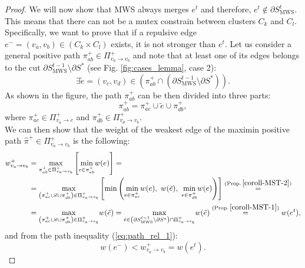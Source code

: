 \begin{proof}
We will now show that MWS always merges $e^{t}$ and therefore, $e^{t} \notin \partial S_{\mathrm{MWS}}^{t}$. This means that there can not be a mutex constrain between clusters $C_{k}$ and $C_{l}$. %
Specifically, we want to prove that if a repulsive edge $e^{-}=(v_{a},v_{b})\in(C_{k}\times C_{l})$
exists, it is not stronger than $e^{t}$. Let us consider a general positive path $\pi_{ab}^{+}\in\Pi_{v_{a}\rightarrow v_{b}}^{+}$
and note that at least one of its edges belongs to the cut $\partial S_{\mathrm{MWS}}^{t-1}\setminus\partial S^{*}$ (see Fig. \ref{fig:cases_lemma}, case 2): 
\[
\exists\tilde{e}=(v_{c},v_{d})\in\left(\pi_{ab}^{+}\cap\left(\partial S_{\mathrm{MWS}}^{t-1}\setminus\partial S^{*}\right)\right).
\]
As shown in the figure, the path $\pi_{ab}^{+}$ can be then divided into three parts:
\[
\pi_{ab}^{+}=\pi_{ac}^{+}\cup\tilde{e}\cup\pi_{db}^{+},
\]
where $\pi_{ac}^{+}\in\Pi_{v_{a}\rightarrow c}^{+}$ and $\pi_{db}^{+}\in\Pi_{v_{d}\rightarrow v_{b}}^{+}$.\\
We can then show that the weight of the weakest edge of the maximin positive path $\hat{\pi}^{+}\in\Pi_{v_{a}\rightarrow v_{b}}^{+}$ is the following:
\begin{align*}
w_{v_{a}\rightarrow v_{b}}^{+} & =\underset{\pi_{ab}^{+}\in\Pi_{v_{a}\rightarrow v_{b}}^{+}}{\max}\left[\underset{e\in\pi_{ab}^{+}}{\min}w(e)\right]=\\
 & =\underset{\left(\pi_{ac}^{+}\cup\tilde{e}\cup\pi_{db}^{+}\right)\in\Pi_{v_{a}\rightarrow v_{b}}^{+}}{\max}\left[\min\left( \underset{e\in\pi_{ac}^{+}}{\min}w(e),\,\,w(\tilde{e}),\,\,\underset{e\in\pi_{db}^{+}}{\min}w(e)\right) \right]\stackrel{(\mathrm{Prop.\,}\ref{coroll-MST-2})}{=}\\
 & =\underset{\left(\pi_{ac}^{+}\cup\tilde{e}\cup\pi_{db}^{+}\right)\in\Pi_{v_{a}\rightarrow v_{b}}^{+}}{\max}w(\tilde{e})=\underset{\tilde{e}\in\left(\partial S_{\mathrm{MWS}}^{t-1}\setminus\partial S^{*}\right) \cap \Pi_{v_{a}\rightarrow v_{b}}^{+}}{\max}w(\tilde{e})\stackrel{(\mathrm{Prop.\,}\ref{coroll-MST-1})}{=}w(e^{t}),
\end{align*}
and from the path inequality (\ref{eq:path_rel_1}):
\[
w(e^{-}) < w_{v_{a}\rightarrow v_{b}}^{+}=w(e^{t}).
\]


\end{proof}
